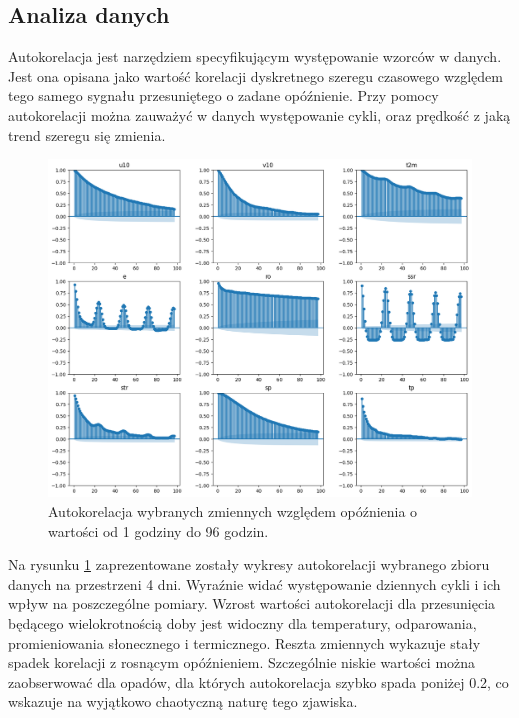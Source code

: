 \subsection{Analiza danych}

Autokorelacja jest narzędziem specyfikującym występowanie wzorców w danych. Jest ona 
opisana jako wartość korelacji dyskretnego szeregu czasowego względem tego samego sygnału
przesuniętego o zadane opóźnienie. Przy pomocy autokorelacji można zauważyć w danych
występowanie cykli, oraz prędkość z jaką trend szeregu się zmienia.

\begin{figure}[H]
    \centering
    \includegraphics[width=\textwidth]{images/autocorrelation.png}
    \caption{Autokorelacja wybranych zmiennych względem opóźnienia o wartości od 
    1 godziny do 96 godzin.}
    \label{autocorrelation}
\end{figure}

Na rysunku \ref{autocorrelation} zaprezentowane zostały wykresy autokorelacji wybranego
zbioru danych na przestrzeni 4 dni. Wyraźnie widać występowanie dziennych cykli i ich wpływ
na poszczególne pomiary. Wzrost wartości autokorelacji dla przesunięcia będącego
wielokrotnością doby jest widoczny dla temperatury, odparowania, promieniowania słonecznego i 
termicznego. Reszta zmiennych wykazuje stały spadek korelacji z rosnącym opóźnieniem. 
Szczególnie niskie wartości można zaobserwować dla opadów, dla których autokorelacja szybko spada
poniżej 0.2, co wskazuje na wyjątkowo chaotyczną naturę tego zjawiska.

